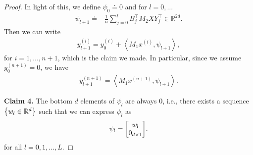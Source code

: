 \documentclass{article}
\newcommand{\R}{\mathbb{R}}
\newcommand{\indot}[2]{{\left<#1, #2\right>}}
\begin{document}
\begin{proof}
    
    In light of this,
    we define $\psi_0 \doteq 0$ and for $l = 0, \dots$
    \begin{align}
      \psi_{l+1} \doteq& \frac{1}{n}\sum_{j=0}^l B_j^\top M_2 X Y_j^\top \in \R^{2d}. \label{eq: theta_l define}
    \end{align}
    Then we can write
    \begin{align}
        y_{l+1}^{(i)} = y_0^{(i)} + \indot{M_1 x^{(i)}}{\psi_{l+1}}, \label{eq: y_l+1 evol theta}
    \end{align}
    for $i=1, \dots, n+1$, which is the claim we made.
    In particular, since we assume $y_0^{(n+1)} = 0$, we have
    \begin{align}
      y_{l+1}^{(n+1)} = \indot{M_1 x^{(n+1)}}{\psi_{l+1}}. 
    \end{align}
    
    
    \textbf{Claim 4.} The bottom $d$ elements of $\psi_l$ are always 0, i.e., there exists a sequence $\qty{w_l \in \R^d}$ such that we can express $\psi_l$ as
    \begin{align}
        \psi_l = \mqty[w_l \\ 0_{d \times 1}]. \label{eq: theta_l sparsity}
    \end{align}
    for all $l = 0,1,\dots, L$.
    

\end{proof}
\end{document}
